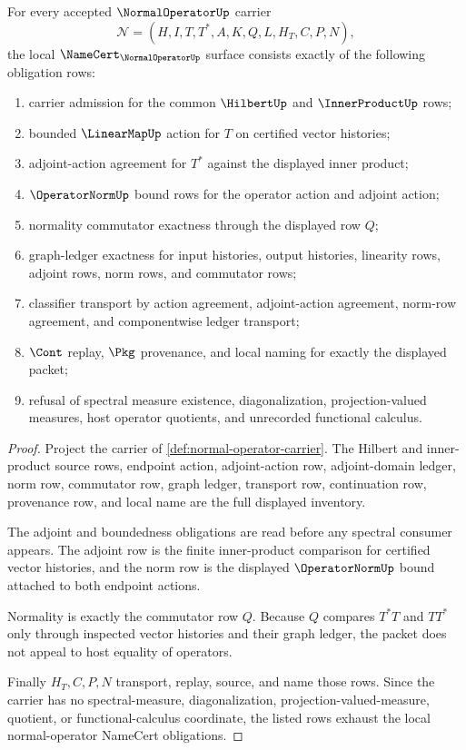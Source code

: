 \begin{theorem}
\label{thm:normal-operator-namecert-obligations}
For every accepted $\NormalOperatorUp$ carrier
$$
\mathcal{N}=(H,I,T,T^\ast,A,K,Q,L,H_T,C,P,N),
$$
the local $\NameCert_{\NormalOperatorUp}$ surface consists exactly of the following obligation rows:
\begin{enumerate}
\item carrier admission for the common $\HilbertUp$ and $\InnerProductUp$ rows;
\item bounded $\LinearMapUp$ action for $T$ on certified vector histories;
\item adjoint-action agreement for $T^\ast$ against the displayed inner product;
\item $\OperatorNormUp$ bound rows for the operator action and adjoint action;
\item normality commutator exactness through the displayed row $Q$;
\item graph-ledger exactness for input histories, output histories, linearity rows, adjoint rows, norm rows, and commutator rows;
\item classifier transport by action agreement, adjoint-action agreement, norm-row agreement, and componentwise ledger transport;
\item $\Cont$ replay, $\Pkg$ provenance, and local naming for exactly the displayed packet;
\item refusal of spectral measure existence, diagonalization, projection-valued measures, host operator quotients, and unrecorded functional calculus.
\end{enumerate}
\end{theorem}
\begin{proof}
Project the carrier of \autoref{def:normal-operator-carrier}. The Hilbert and inner-product source rows, endpoint action, adjoint-action row, adjoint-domain ledger, norm row, commutator row, graph ledger, transport row, continuation row, provenance row, and local name are the full displayed inventory.

The adjoint and boundedness obligations are read before any spectral consumer appears. The adjoint row is the finite inner-product comparison for certified vector histories, and the norm row is the displayed $\OperatorNormUp$ bound attached to both endpoint actions.

Normality is exactly the commutator row $Q$. Because $Q$ compares $T^\ast T$ and $T T^\ast$ only through inspected vector histories and their graph ledger, the packet does not appeal to host equality of operators.

Finally $H_T,C,P,N$ transport, replay, source, and name those rows. Since the carrier has no spectral-measure, diagonalization, projection-valued-measure, quotient, or functional-calculus coordinate, the listed rows exhaust the local normal-operator NameCert obligations.
\end{proof}

